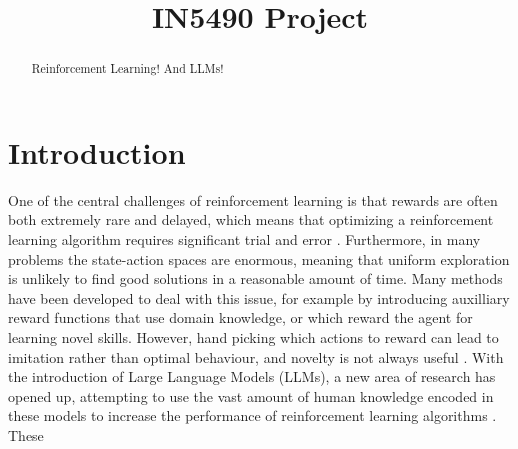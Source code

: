 \documentclass[conference]{IEEEtran}
\begin{document}
\title{IN5490 Project}

\author{
\and
{}
\and
{}
}

\maketitle

\begin{abstract}

Reinforcement Learning! And LLMs!

\end{abstract}

\begin{IEEEkeywords}
\end{IEEEkeywords}

\section{Introduction}

One of the central challenges of reinforcement learning is that rewards are often both extremely rare and delayed, which means that optimizing a reinforcement learning algorithm requires significant trial and error \cite[423]{brunton}. Furthermore, in many problems the state-action spaces are enormous, meaning that uniform exploration is unlikely to find good solutions in a reasonable amount of time. Many methods have been developed to deal with this issue, for example by introducing auxilliary reward functions that use domain knowledge, or which reward the agent for learning novel skills. However, hand picking which actions to reward can lead to imitation rather than optimal behaviour, and novelty is not always useful \cite[2]{ellm}. With the introduction of Large Language Models (LLMs), a new area of research has opened up, attempting to use the vast amount of human knowledge encoded in these models to increase the performance of reinforcement learning algorithms \cite{survey}. These 
\end{document}
